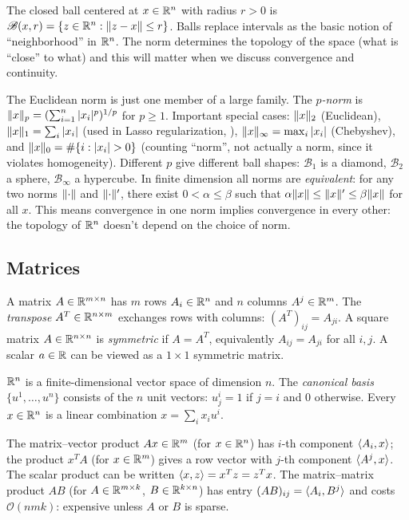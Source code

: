 \begin{definition}[Ball]\label{def:ball}
	The closed ball centered at $x \in \mathbb{R}^n$ with radius $r > 0$ is
	$\mathcal{B}(x, r) = \{z \in \mathbb{R}^n : \lVert z - x\rVert \leq r\}$.
	Balls replace intervals as the basic notion of ``neighborhood'' in $\mathbb{R}^n$.
	The norm determines the topology of the space (what is ``close'' to what) and this will matter when we discuss convergence and continuity.
\end{definition}


The Euclidean norm is just one member of a large family.
The \emph{$p$-norm} is $\lVert x\rVert_p = (\sum_{i=1}^{n} |x_i|^p)^{1/p}$ for $p \geq 1$.
Important special cases: $\lVert x\rVert_2$ (Euclidean), $\lVert x\rVert_1 = \sum_i |x_i|$ (used in Lasso regularization, ), $\lVert x\rVert_\infty = \max_i |x_i|$ (Chebyshev), and $\lVert x\rVert_0 = \#\{i : |x_i| > 0\}$ (counting ``norm'', not actually a norm, since it violates homogeneity).
Different $p$ give different ball shapes: $\mathcal{B}_1$ is a diamond, $\mathcal{B}_2$ a sphere, $\mathcal{B}_\infty$ a hypercube.
In finite dimension all norms are \emph{equivalent}: for any two norms $\lVert\cdot\rVert$ and $\lVert\cdot\rVert'$, there exist $0 < \alpha \leq \beta$ such that $\alpha\lVert x\rVert \leq \lVert x\rVert' \leq \beta\lVert x\rVert$ for all $x$.
This means convergence in one norm implies convergence in every other: the topology of $\mathbb{R}^n$ doesn't depend on the choice of norm.


\subsection{Matrices}\label{sec:matrices}

A matrix $A \in \mathbb{R}^{m \times n}$ has $m$ rows $A_i \in \mathbb{R}^n$ and $n$ columns $A^j \in \mathbb{R}^m$.
The \emph{transpose} $A^T \in \mathbb{R}^{n \times m}$ exchanges rows with columns: $(A^T)_{ij} = A_{ji}$.
A square matrix $A \in \mathbb{R}^{n \times n}$ is \emph{symmetric} if $A = A^T$, equivalently $A_{ij} = A_{ji}$ for all $i, j$.
A scalar $a \in \mathbb{R}$ can be viewed as a $1 \times 1$ symmetric matrix.

$\mathbb{R}^n$ is a finite-dimensional vector space of dimension $n$.
The \emph{canonical basis} $\{u^1, \dots, u^n\}$ consists of the $n$ unit vectors: $u^i_j = 1$ if $j = i$ and $0$ otherwise.
Every $x \in \mathbb{R}^n$ is a linear combination $x = \sum_i x_i u^i$.

The matrix--vector product $Ax \in \mathbb{R}^m$ (for $x \in \mathbb{R}^n$) has $i$-th component $\langle A_i, x\rangle$; the product $x^T A$ (for $x \in \mathbb{R}^m$) gives a row vector with $j$-th component $\langle A^j, x\rangle$.
The scalar product can be written $\langle x, z\rangle = x^T z = z^T x$.
The matrix--matrix product $AB$ (for $A \in \mathbb{R}^{m \times k}$, $B \in \mathbb{R}^{k \times n}$) has entry $(AB)_{ij} = \langle A_i, B^j\rangle$ and costs $\mathcal{O}(nmk)$: expensive unless $A$ or $B$ is sparse.

